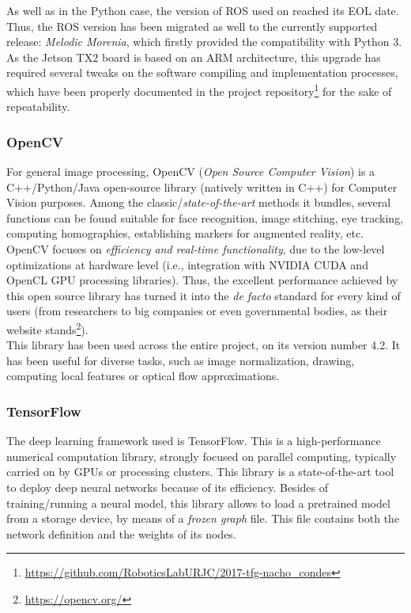 As well as in the Python case, the version of ROS used on \cite{tfg} reached its EOL date. Thus, the ROS version has been migrated as well to the currently supported release: \textit{Melodic Morenia}, which firstly provided the compatibility with Python 3. As the Jetson TX2 board is based on an ARM architecture, this upgrade has required several tweaks on the software compiling and implementation processes, which have been properly documented in the project repository\footnote{\url{https://github.com/RoboticsLabURJC/2017-tfg-nacho_condes}} for the sake of repeatability.\\


\subsubsection{OpenCV}
For general image processing, OpenCV (\emph{Open Source Computer Vision}) is a C++/Python/Java open-source library (natively written in C++) for Computer Vision purposes. Among the classic/\emph{state-of-the-art} methods it bundles, several functions can be found suitable for face recognition, image stitching, eye tracking, computing homographies, establishing markers for augmented reality, etc.\\

OpenCV focuses on \emph{efficiency and real-time functionality}, due to the low-level optimizations at hardware level (i.e., integration with NVIDIA CUDA and OpenCL GPU processing libraries). Thus, the excellent performance achieved by this open source library has turned it into the \emph{de facto} standard for every kind of users (from researchers to big companies or even governmental bodies, as their website stands\footnote{\url{https://opencv.org/}}).\\

This library has been used across the entire project, on its version number 4.2.  It has been useful for diverse tasks, such as image normalization, drawing, computing local features or optical flow approximations.



\subsubsection{TensorFlow}


The deep learning framework used is TensorFlow. This is a high-performance numerical computation library, strongly focused on parallel computing, typically carried on by GPUs or processing clusters. This library is a state-of-the-art tool to deploy deep neural networks because of its efficiency. Besides of training/running a neural model, this library allows to load a pretrained model from a storage device, by means of a \textit{frozen graph} file. This file contains both the network definition and the weights of its nodes.\\

